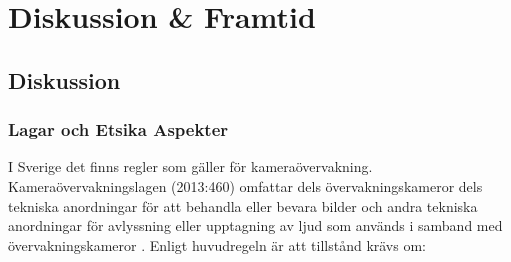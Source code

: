 
\chapter{Diskussion \& Framtid} %
\label{ch:diskussion}


\ifpdf
    \graphicspath{{7/figures/PNG/}{7/figures/PDF/}{7/figures/}}
\else
    \graphicspath{{7/figures/EPS/}{7/figures/}}
\fi





\section{Diskussion}
\subsection{Lagar och Etsika Aspekter}
I Sverige det finns regler som gäller för kameraövervakning. Kameraövervakningslagen (2013:460) omfattar dels övervakningskameror dels tekniska anordningar för att behandla eller bevara bilder och andra tekniska anordningar för avlyssning eller upptagning av ljud som används i samband med övervakningskameror \cite{lansstyrelsen}. 
Enligt huvudregeln är att tillstånd krävs om:

